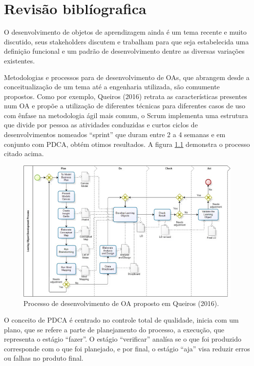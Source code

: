 \documentclass[12pt,openright,oneside,a4paper,english,french,spanish,brazil]{unifil}
\begin{document}
\chapter{Revisão biblíografica}%

O desenvolvimento de objetos de aprendizagem ainda é um tema recente e muito discutido, seus stakeholders  discutem e trabalham para que seja estabelecida uma definição funcional e um padrão de desenvolvimento dentre  as diversas variações existentes. 
\par Metodologias e processos para de desenvolvimento de OAs, que abrangem desde a conceitualização de um tema até a engenharia utilizada, são comumente propostos. Como por exemplo, Queiros (2016) retrata as características presentes num OA e propõe a utilização de diferentes técnicas para diferentes casos de uso com ênfase na metodologia ágil mais comum, o Scrum implementa uma estrutura que divide por pessoa as atividades conduzidas e curtos ciclos de desenvolvimentos nomeados ``sprint'' que duram entre 2 a 4 semanas e em conjunto com PDCA, obtém otimos resultados. {A figura \ref{img:lodpro} demonstra o processo citado acima}.
	\begin{figure}[htb]
	\centering
	\includegraphics[scale=0.2]{images/LODPRO.png}
	\caption{Processo de desenvolvimento de OA proposto em Queiros (2016).}
	\label{img:lodpro}
\end{figure}
\par O conceito de PDCA é centrado no controle total de qualidade, inicia com um plano, que se refere a parte de planejamento do processo, a execução, que representa o estágio ``fazer''. O estágio ``verificar'' analísa se o que foi produzido corresponde com o que foi planejado, e por final, o estágio ``aja'' visa reduzir erros ou falhas no produto final.
\end{document}
